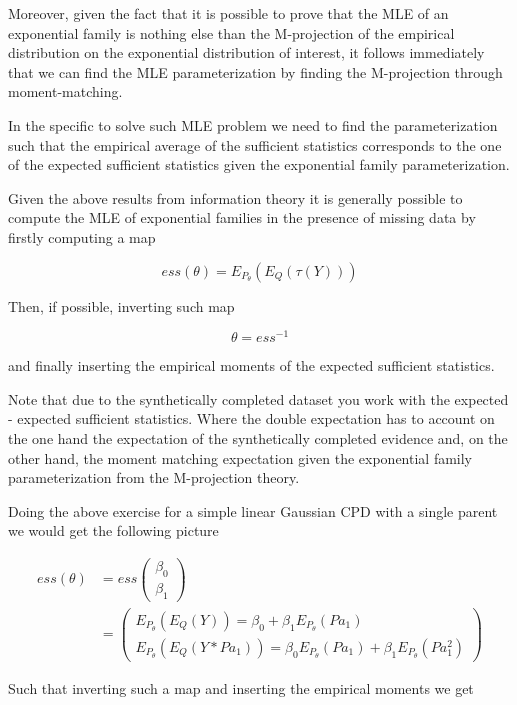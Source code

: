 \documentclass[11pt]{article}
\begin{document}
\begin{article}
Moreover, given the fact that it is possible to prove that the MLE
of an exponential family is nothing else than the M-projection of
the empirical distribution on the exponential distribution of
interest, it follows immediately that we can find the MLE
parameterization by finding the M-projection through
moment-matching.

In the specific to solve such MLE problem we need to find the
parameterization such that the empirical average of the sufficient
statistics corresponds to the one of the expected sufficient
statistics given the exponential family parameterization.

Given the above results from information theory it is generally
possible to compute the MLE of exponential families in the presence
of missing data by firstly computing a map

$$ess(\theta) = E_{P_\theta}(E_Q(\tau(Y)))$$

Then, if possible, inverting such map

$$\theta = ess^{-1}$$

and finally inserting the empirical moments of the expected
sufficient statistics.

Note that due to the synthetically completed dataset you work with
the expected - expected sufficient statistics. Where the double
expectation has to account on the one hand the expectation of the
synthetically completed evidence and, on the other hand, the moment
matching expectation given the exponential family parameterization
from the M-projection theory.

Doing the above exercise for a simple linear Gaussian CPD with a
single parent we would get the following picture

 \begin{align*}
 ess (\theta) &= ess\begin{pmatrix}
                 \beta_0\\
		 \beta_1
		 \end{pmatrix} \\
		 &= \begin{pmatrix}
		 E_{P_\theta}(E_Q(Y)) = \beta_0 + \beta_1 E_{P_\theta}(Pa_1) \\
		 E_{P_\theta}(E_Q(Y * Pa_1)) = \beta_0 E_{P_\theta}(Pa_1) + \beta_1 E_{P_\theta}(Pa_1^2)
		 \end{pmatrix}
\end{align*}


Such that inverting such a map and inserting the empirical moments
we get


\end{article}
\end{document}
